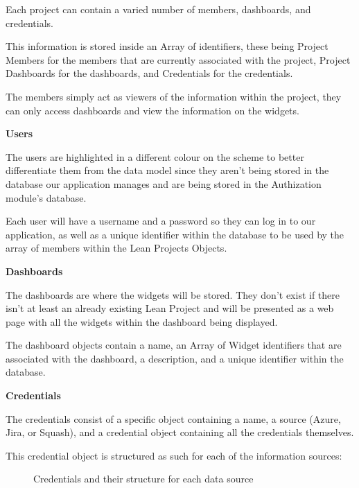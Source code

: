 \documentclass[a4paper,twoside,10pt]{report}
\begin{document}
Each project can contain a varied number of members, dashboards, and credentials. 

This information is stored inside an Array of identifiers, these being Project Members for the members that are currently associated with the project, Project Dashboards for the dashboards, and Credentials for the credentials.

The members simply act as viewers of the information within the project, they can only access dashboards and view the information on the widgets.


\textbf{Users}

The users are highlighted in a different colour on the scheme to better differentiate them from the data model since they aren't being stored in the database our application manages and are being stored in the Authization module's database.

Each user will have a username and a password so they can log in to our application, as well as a unique identifier within the database to be used by the array of members within the Lean Projects Objects.


\textbf{Dashboards}

The dashboards are where the widgets will be stored. They don't exist if there isn't at least an already existing Lean Project and will be presented as a web page with all the widgets within the dashboard being displayed.

The dashboard objects contain a name, an Array of Widget identifiers that are associated with the dashboard, a description, and a unique identifier within the database.


\textbf{Credentials}

The credentials consist of a specific object containing a name, a source (Azure, Jira, or Squash), and a credential object containing all the credentials themselves.

This credential object is structured as such for each of the information sources:

\begin{figure}[h!]
\center
\caption{Credentials and their structure for each data source}
\end{figure}
\end{document}
